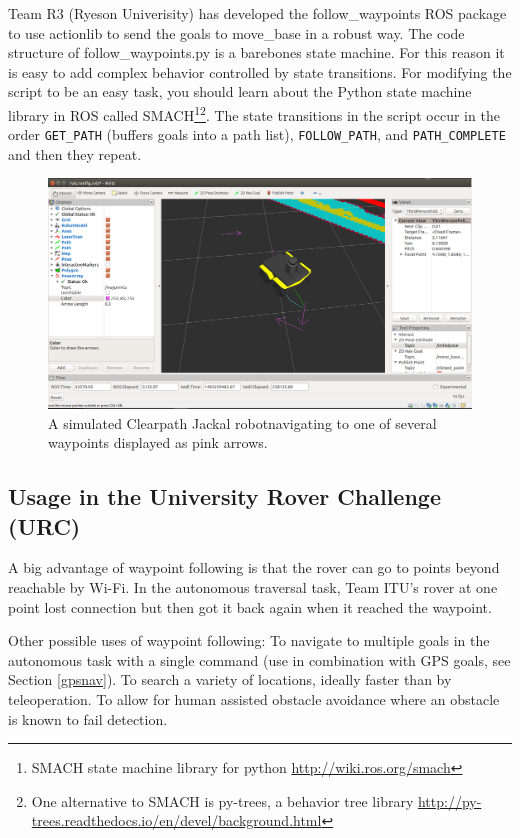\documentclass[runningheads,a4paper]{llncs}
\begin{document}
Team R3 (Ryeson Univerisity) has developed the follow\_waypoints ROS package to use actionlib to send the goals to move\_base in a robust way. The code structure of follow\_waypoints.py is a barebones state machine. For this reason it is easy to add complex behavior controlled by state transitions. For modifying the script to be an easy task, you should learn about the Python state machine library in ROS called SMACH\footnote{SMACH state machine library for python \url{http://wiki.ros.org/smach}}\footnote{One alternative to SMACH is py-trees, a behavior tree library \url{http://py-trees.readthedocs.io/en/devel/background.html}}. The state transitions in the script occur in the order \texttt{GET\_PATH} (buffers goals into a path list), \texttt{FOLLOW\_PATH}, and \texttt{PATH\_COMPLETE} and then they repeat.

\begin{figure}
\centering
\includegraphics[width=\textwidth]{waypoints2}
\caption{A simulated Clearpath Jackal robot\protect\footnotemark navigating to one of several waypoints displayed as pink arrows.}
\label{fig:waypoints2}
\end{figure}

\subsection{Usage in the University Rover Challenge (URC)}
A big advantage of waypoint following is that the rover can go to points beyond reachable by Wi-Fi. In the autonomous traversal task, Team ITU's rover at one point lost connection but then got it back again when it reached the waypoint.

Other possible uses of waypoint following: To navigate to multiple goals in the autonomous task with a single command (use in combination with GPS goals, see Section \ref{gpsnav}). To search a variety of locations, ideally faster than by teleoperation. To allow for human assisted obstacle avoidance where an obstacle is known to fail detection.
\end{document}
